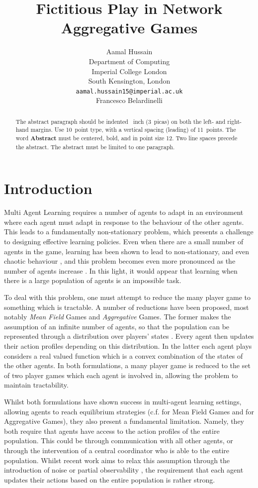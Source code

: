 \documentclass{article}
\title{Fictitious Play in Network Aggregative Games}
\author{%
 Aamal Hussain  \\
  Department of Computing\\
  Imperial College London\\
  South Kensington, London \\
  \texttt{aamal.hussain15@imperial.ac.uk} \\
  \And
  Francesco Belardinelli
}
\theoremstyle{definition}
\begin{document}
\maketitle

\begin{abstract}
  The abstract paragraph should be indented ~inch (3~picas) on
  both the left- and right-hand margins. Use 10~point type, with a vertical
  spacing (leading) of 11~points.  The word \textbf{Abstract} must be centered,
  bold, and in point size 12. Two line spaces precede the abstract. The abstract
  must be limited to one paragraph.
\end{abstract}

\section{Introduction}

Multi Agent Learning \cite{Schwartz} requires a number of agents to adapt in an environment where
each agent must adapt in response to the behaviour of the other agents. This leads to a
fundamentally non-stationary problem, which presents a challenge to designing effective learning
policies. Even when there are a small number of agents in the game, learning has been shown to lead
to non-stationary, and even chaotic behaviour \cite{SatoChaos}, and this problem becomes even more
pronounced as the number of agents increase \cite{Sanders}. In this light, it would appear that
learning when there is a large population of agents is an impossible task. 

To deal with this problem, one must attempt to reduce the many player game to something which is
tractable. A number of reductions have been proposed, most notably \emph{Mean Field} Games
and \emph{Aggregative} Games. The former makes the assumption of an infinite
number of agents, so that the population can be represented through a distribution over players'
states \cite{CainesPaper} . Every agent then updates their action profiles depending on this
distribution. In the latter each agent plays considers a real valued function which is a convex
combination of the states of the other agents. In both formulations, a many player game is reduced
to the set of two player games which each agent is involved in, allowing the problem to maintain
tractability. 

Whilst both formulations have shown success in multi-agent learning settings, allowing agents to
reach equilibrium strategies (c.f. \cite{MFGLearningPapers} for Mean Field Games and
\cite{Aggregative Papers} for Aggregative Games), they also present a fundamental limitation.
Namely, they both require that agents have access to the action profiles of the entire population.
This could be through communication with all other agents, or through the intervention of a central
coordinator who is able to the entire population. Whilst recent work aims to relax this assumption
through the introduction of noise \cite{MFG-FP} or partial observability \cite{AAMASPaper}, the
requirement that each agent updates their actions based on the entire population is rather strong.
\end{document}
